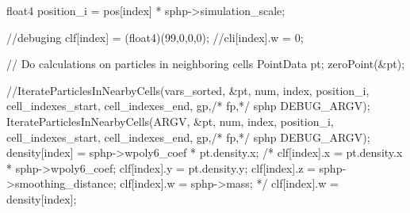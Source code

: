 \begin{cppcode}{0}
{    float4 position_i = pos[index] * sphp->simulation_scale;

    //debuging
    clf[index] = (float4)(99,0,0,0);
    //cli[index].w = 0;

    // Do calculations on particles in neighboring cells
    PointData pt;
    zeroPoint(&pt);

    //IterateParticlesInNearbyCells(vars_sorted, &pt, num, index, position_i, cell_indexes_start, cell_indexes_end, gp,/* fp,*/ sphp DEBUG_ARGV);
    IterateParticlesInNearbyCells(ARGV, &pt, num, index, position_i, cell_indexes_start, cell_indexes_end, gp,/* fp,*/ sphp DEBUG_ARGV);
    density[index] = sphp->wpoly6_coef * pt.density.x;
    /*
    clf[index].x = pt.density.x * sphp->wpoly6_coef;
    clf[index].y = pt.density.y;
    clf[index].z = sphp->smoothing_distance;
    clf[index].w = sphp->mass;
    */
    clf[index].w = density[index];
}

\end{cppcode}

